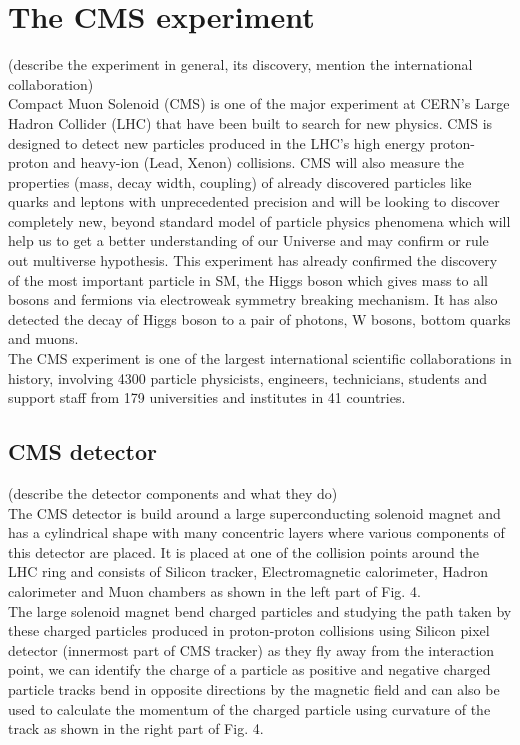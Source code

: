 \section{The CMS experiment}
\label{sec:cms}
(describe the experiment in general, its discovery, mention the international collaboration) \\

\onehalfspacing Compact Muon Solenoid (CMS) is one of the major experiment at CERN's Large Hadron Collider (LHC) that have been built to search for new physics. CMS is designed to detect new particles produced in the LHC's high energy proton-proton and heavy-ion (Lead, Xenon) collisions. CMS will also measure the properties (mass, decay width, coupling) of already discovered particles like quarks and leptons with unprecedented precision and will be looking to discover completely new, beyond standard model of particle physics phenomena which will help us to get a better understanding of our Universe and may confirm or rule out multiverse hypothesis. This experiment has already confirmed the discovery of the most important particle in SM, the Higgs boson which gives mass to all bosons and fermions via electroweak symmetry breaking mechanism. It has also detected the decay of Higgs boson to a pair of photons, W bosons, bottom quarks and muons.  \\

The CMS experiment is one of the largest international scientific collaborations in history, involving 4300 particle physicists, engineers, technicians, students and support staff from 179 universities and institutes in 41 countries. \\

\subsection{CMS detector}
(describe the detector components and what they do) \\

The CMS detector is build around a large superconducting solenoid magnet and has a cylindrical shape with many concentric layers where various components of this detector are placed. It is placed at one of the collision points around the LHC ring and consists of Silicon tracker, Electromagnetic calorimeter, Hadron calorimeter and Muon chambers as shown in the left part of Fig. 4. \\

The large solenoid magnet bend charged particles and studying the path taken by these charged particles produced in proton-proton collisions using Silicon pixel detector (innermost part of CMS tracker) as they fly away from the interaction point, we can identify the charge of a particle as positive and negative charged particle tracks bend in opposite directions by the magnetic field and can also be used to calculate the momentum of the charged particle using curvature of the track as shown in the right part of Fig. 4. \\

